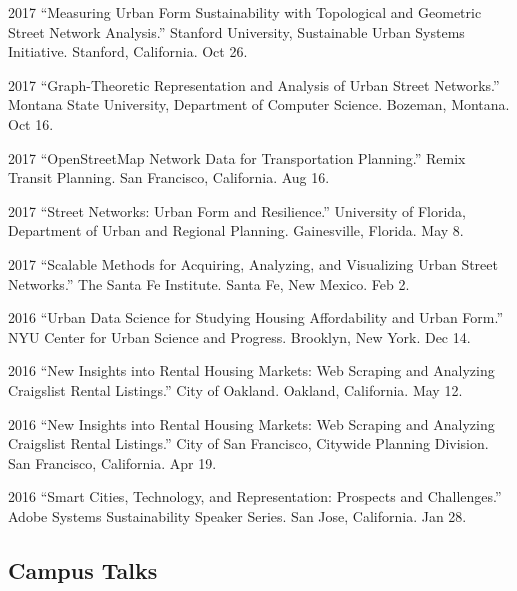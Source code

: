 \documentclass[12pt,letterpaper]{report}
\begin{document}
\begin{tablist}
		\item[2017] \tab \enquote{Measuring Urban Form Sustainability with Topological and Geometric Street Network Analysis.} Stanford University, Sustainable Urban Systems Initiative. Stanford, California. Oct 26.
		
		\item[2017] \tab \enquote{Graph-Theoretic Representation and Analysis of Urban Street Networks.} Montana State University, Department of Computer Science. Bozeman, Montana. Oct 16.
		
		\item[2017] \tab \enquote{OpenStreetMap Network Data for Transportation Planning.} Remix Transit Planning. San Francisco, California. Aug 16.
		
		\item[2017] \tab \enquote{Street Networks: Urban Form and Resilience.} University of Florida, Department of Urban and Regional Planning. Gainesville, Florida. May 8.
		
		\item[2017] \tab \enquote{Scalable Methods for Acquiring, Analyzing, and Visualizing Urban Street Networks.} The Santa Fe Institute. Santa Fe, New Mexico. Feb 2.
		
		\item[2016] \tab \enquote{Urban Data Science for Studying Housing Affordability and Urban Form.} NYU Center for Urban Science and Progress. Brooklyn, New York. Dec 14.
		
		\item[2016] \tab \enquote{New Insights into Rental Housing Markets: Web Scraping and Analyzing Craigslist Rental Listings.} City of Oakland. Oakland, California. May 12.
		
		\item[2016] \tab \enquote{New Insights into Rental Housing Markets: Web Scraping and Analyzing Craigslist Rental Listings.} City of San Francisco, Citywide Planning Division. San Francisco, California. Apr 19.
		
		\item[2016] \tab \enquote{Smart Cities, Technology, and Representation: Prospects and Challenges.} Adobe Systems Sustainability Speaker Series. San Jose, California. Jan 28.
		
	\end{tablist}
	
	\subsection*{Campus Talks}
	
\end{document}
